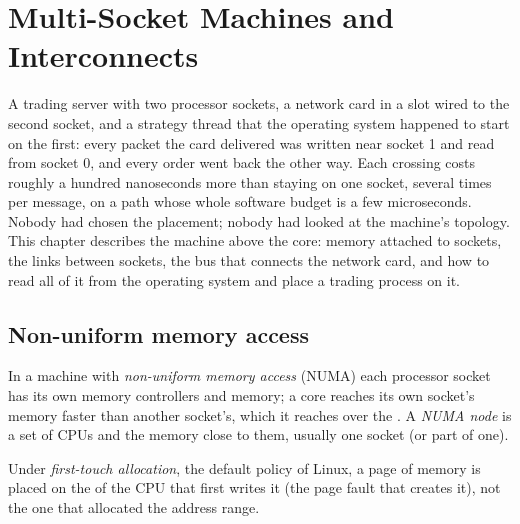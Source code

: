 \chapter{Multi-Socket Machines and Interconnects}\label{ch:ll:multi-socket-machines-and-interconnects}

A trading server with two processor sockets, a network card in a slot wired to the second socket, and a strategy
thread that the operating system happened to start on the first: every packet the card delivered was written near
socket 1 and read from socket 0, and every order went back the other way. Each crossing costs roughly a hundred
nanoseconds more than staying on one socket, several times per message, on a path whose whole software budget is a
few microseconds. Nobody had chosen the placement; nobody had looked at the machine's topology. This chapter describes
the machine above the core: memory attached to sockets, the links between sockets, the bus that connects the network
card, and how to read all of it from the operating system and place a trading process on it.

\section{Non-uniform memory access}

\begin{definition}\label{def:ll:multi-socket-machines-and-interconnects:numa}
In a machine with \emph{non-uniform memory access} (NUMA) each processor socket has its
own memory controllers and memory; a core reaches its own socket's memory faster than another socket's, which it
reaches over the . A \emph{NUMA node} is a set of CPUs and the memory close to them,
usually one socket (or part of one).
\end{definition}

\begin{definition}\label{def:ll:multi-socket-machines-and-interconnects:first}
Under \emph{first-touch allocation}, the default policy of Linux, a page of memory is
placed on the  of the CPU that first writes it (the page fault that creates it), not the one that allocated
the address range.
\end{definition}

